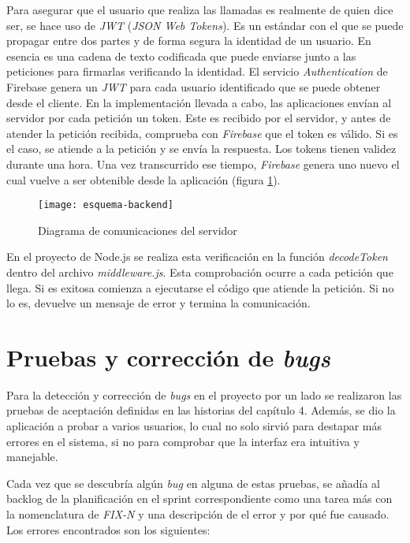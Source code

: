 Para asegurar que el usuario que realiza las llamadas es realmente de quien dice ser, se hace uso de \textit{JWT} (\textit{JSON Web Tokens}). Es un estándar con el que se puede propagar entre dos partes y de forma segura la identidad de un usuario. En esencia es una cadena de texto codificada que puede enviarse junto a las peticiones para firmarlas verificando la identidad. El servicio \textit{Authentication} de Firebase genera un \textit{JWT} para cada usuario identificado que se puede obtener desde el cliente. En la implementación llevada a cabo, las aplicaciones envían al servidor por cada petición un token. Este es recibido por el servidor, y antes de atender la petición recibida, comprueba con \textit{Firebase} que el token es válido. Si es el caso, se atiende a la petición y se envía la respuesta. Los tokens tienen validez durante una hora. Una vez transcurrido ese tiempo, \textit{Firebase} genera uno nuevo el cual vuelve a ser obtenible desde la aplicación (figura \ref{fig:esquemabackend}).

\begin{figure}[h]
    \centering
    \texttt{[image: esquema-backend]}
    \caption[Diagrama de comunicaciones del servidor]{Diagrama de comunicaciones del servidor}
    \label{fig:esquemabackend}
\end{figure}

En el proyecto de Node.js se realiza esta verificación en la función \textit{decodeToken} dentro del archivo \textit{middleware.js}. Esta comprobación ocurre a cada petición que llega. Si es exitosa comienza a ejecutarse el código que atiende la petición. Si no lo es, devuelve un mensaje de error y termina la comunicación.

\section{Pruebas y corrección de \textit{bugs}}

Para la detección y corrección de \textit{bugs} en el proyecto por un lado se realizaron las pruebas de aceptación definidas en las historias del capítulo 4. Además, se dio la aplicación a probar a varios usuarios, lo cual no solo sirvió para destapar más errores en el sistema, si no para comprobar que la interfaz era intuitiva y manejable.

Cada vez que se descubría algún \textit{bug} en alguna de estas pruebas, se añadía al backlog de la planificación en el sprint correspondiente como una tarea más con la nomenclatura de \textit{FIX-N} y una descripción de el error y por qué fue causado. Los errores encontrados son los siguientes:

